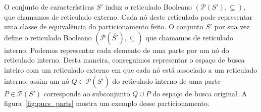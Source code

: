 \documentclass[12pt]{article}
\newcommand{\powerset}{\mathcal{P}}
\begin{document}
O conjunto de características $S'$ induz o reticulado Booleano 
$(\powerset(S'), \subseteq)$, que chamamos de reticulado externo. Cada
nó deste reticulado pode representar uma classe de equivalência do 
particionamento feito. O conjunto $\overline{S'}$ por sua vez define o
reticulado Booleano $(\powerset(\overline{S'}), \subseteq)$ que chamamos
de reticulado interno. Podemos representar cada elemento de uma parte
por um nó do reticulado interno. Desta maneira, conseguimos representar
o espaço de busca inteiro com um reticulado externo em que cada nó está
associado a um reticulado interno, assim um nó 
$Q \in \powerset(\overline{S'})$ do reticulado interno de uma parte 
$P \in \powerset(S')$ corresponde ao subconjunto $Q \cup P$ do espaço 
de busca original. A figura~\ref{fig:pucs_parts} mostra um exemplo desse particionamento.
\end{document}

